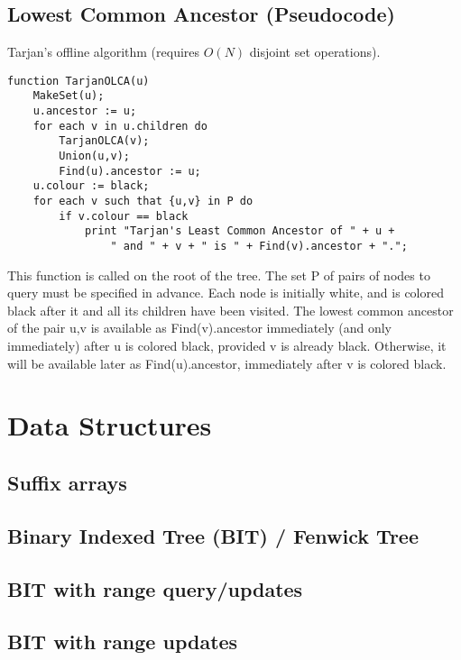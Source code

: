 \documentclass[9pt]{extarticle}
\begin{document}
\begin{multicols*}{3}
\subsection{Lowest Common Ancestor (Pseudocode)} %
Tarjan's offline algorithm (requires $O(N)$ disjoint set operations).
\begin{lstlisting}
function TarjanOLCA(u)
    MakeSet(u);
    u.ancestor := u;
    for each v in u.children do
        TarjanOLCA(v);
        Union(u,v);
        Find(u).ancestor := u;
    u.colour := black;
    for each v such that {u,v} in P do
        if v.colour == black
            print "Tarjan's Least Common Ancestor of " + u +
                " and " + v + " is " + Find(v).ancestor + ".";
\end{lstlisting}
This function is called on the root of the tree. The set P of pairs of nodes to
query must be specified in advance. Each node is initially white, and is
colored black after it and all its children have been visited. The lowest
common ancestor of the pair {u,v} is available as Find(v).ancestor immediately
(and only immediately) after u is colored black, provided v is already black.
Otherwise, it will be available later as Find(u).ancestor, immediately after v
is colored black.

\section{Data Structures}

\subsection{Suffix arrays} %


\subsection{Binary Indexed Tree (BIT) / Fenwick Tree} %


\subsection{BIT with range query/updates}


\subsection{BIT with range updates} %



\end{multicols*}
\end{document}
